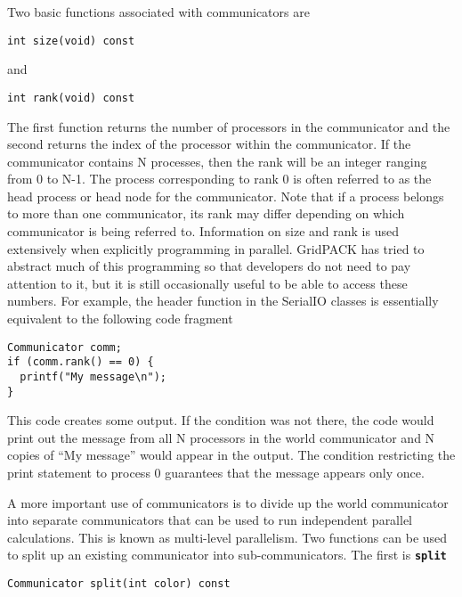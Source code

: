 Two basic functions associated with communicators are

{
\color{red}
\begin{Verbatim}[fontseries=b]
int size(void) const
\end{Verbatim}
}

and

{
\color{red}
\begin{Verbatim}[fontseries=b]
int rank(void) const
\end{Verbatim}
}

The first function returns the number of processors in the communicator and the second returns the index of the processor within the communicator. If the communicator contains N processes, then the rank will be an integer ranging from 0 to N-1. The process corresponding to rank 0 is often referred to as the head process or head node for the communicator. Note that if a process belongs to more than one communicator, its rank may differ depending on which communicator is being referred to. Information on size and rank is used extensively when explicitly programming in parallel. GridPACK has tried to abstract much of this programming so that developers do not need to pay attention to it, but it is still occasionally useful to be able to access these numbers. For example, the header function in the SerialIO classes is essentially equivalent to the following code fragment

{
\color{red}
\begin{Verbatim}[fontseries=b]
Communicator comm;
if (comm.rank() == 0) {
  printf("My message\n");
}
\end{Verbatim}
}

This code creates some output. If the condition was not there, the code would print out the message from all N processors in the world communicator and N copies of ``My message'' would appear in the output. The condition restricting the print statement to process 0 guarantees that the message appears only once.

A more important use of communicators is to divide up the world communicator into separate communicators that can be used to run independent parallel calculations. This is known as multi-level parallelism. Two functions can be used to split up an existing communicator into sub-communicators. The first is \texttt{\textbf{split}}

{
\color{red}
\begin{Verbatim}[fontseries=b]
Communicator split(int color) const
\end{Verbatim}
}


